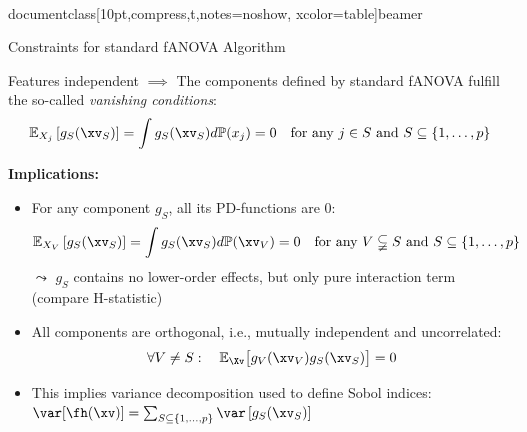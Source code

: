 \\documentclass[10pt,compress,t,notes=noshow, xcolor=table]{beamer}
\begin{document}
\begin{frame}{Constraints for standard fANOVA Algorithm}

    \begin{theorem}
    
        Features independent $\implies$ The components defined by standard fANOVA fulfill the so-called \textit{vanishing conditions}:
        \begin{align*}
            \mathbb{E}_{X_j}\left[ g_{S}(\xv_S) \right]
            = \int g_{S}(\xv_S) d \mathbb{P}(x_j) = 0 \quad \text{for any } j \in S \text{ and } S \subseteq \{1, \ldots, p\}
        \end{align*}
    \end{theorem}


    
    \pause 
    \textbf{Implications:}
    \begin{itemize}
        \item 
        For any component $g_{S}$, all its PD-functions are 0:
        $$
        \mathbb{E}_{X_V}\left[ g_{S}(\xv_S) \right]
        = \int g_{S}(\xv_S) d \mathbb{P}(\xv_V) = 0 \quad \text{for any } V \subsetneqq S \text{ and } S \subseteq \{1, \ldots, p\}
        $$
        $\leadsto$ $g_{S}$ contains no lower-order effects, but only pure interaction term \\
        (compare H-statistic)
        \pause
        \item All components are orthogonal, i.e., mutually independent and uncorrelated:
        $$
        \forall V \neq S: \quad \mathbb{E}_{\Xv} \bigl[ g_{V}(\xv_V) g_{S}(\xv_S) \bigr] = 0
        $$
        \item This implies variance decomposition used to define Sobol indices:
    $ \var[ \fh(\xv) ] =  \textstyle\sum_{S \subseteq \{1,\ldots,p\}}  \var \left[ g_{S}(\xv_S) \right]$
    \end{itemize}
    
\end{frame}
\end{document}
